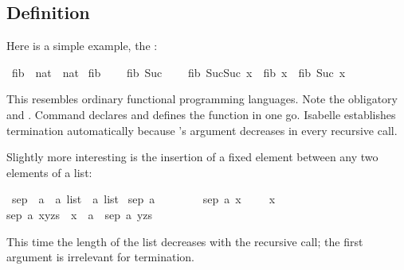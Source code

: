 %
\begin{isabellebody}%
\def\isabellecontext{fun{\isadigit{0}}}%
%
\isadelimtheory
%
\endisadelimtheory
%
\isatagtheory
%
\endisatagtheory
{\isafoldtheory}%
%
\isadelimtheory
%
\endisadelimtheory
%
\begin{isamarkuptext}%
\subsection{Definition}
\label{sec:fun-examples}

Here is a simple example, the :%
\end{isamarkuptext}%
\isamarkuptrue%
\isamarkupfalse%
\ fib\ {\isacharcolon}{\isacharcolon}\ {\isachardoublequoteopen}nat\ {\isasymRightarrow}\ nat{\isachardoublequoteclose}\ \isanewline
{\isachardoublequoteopen}fib\ {}\ {\isacharequal}\ {}{\isachardoublequoteclose}\ {\isacharbar}\isanewline
{\isachardoublequoteopen}fib\ {\isacharparenleft}Suc\ {}{\isacharparenright}\ {\isacharequal}\ {}{\isachardoublequoteclose}\ {\isacharbar}\isanewline
{\isachardoublequoteopen}fib\ {\isacharparenleft}Suc{\isacharparenleft}Suc\ x{\isacharparenright}{\isacharparenright}\ {\isacharequal}\ fib\ x\ {\isacharplus}\ fib\ {\isacharparenleft}Suc\ x{\isacharparenright}{\isachardoublequoteclose}%
\begin{isamarkuptext}%
\noindent
This resembles ordinary functional programming languages. Note the obligatory
 and \isa{|}. Command  declares and
defines the function in one go. Isabelle establishes termination automatically
because 's argument decreases in every recursive call.

Slightly more interesting is the insertion of a fixed element
between any two elements of a list:%
\end{isamarkuptext}%
\isamarkuptrue%
\isamarkupfalse%
\ sep\ {\isacharcolon}{\isacharcolon}\ {\isachardoublequoteopen}{\isacharprime}a\ {\isasymRightarrow}\ {\isacharprime}a\ list\ {\isasymRightarrow}\ {\isacharprime}a\ list{\isachardoublequoteclose}\ \isanewline
{\isachardoublequoteopen}sep\ a\ {\isacharbrackleft}{\isacharbrackright}\ \ \ \ \ {\isacharequal}\ {\isacharbrackleft}{\isacharbrackright}{\isachardoublequoteclose}\ {\isacharbar}\isanewline
{\isachardoublequoteopen}sep\ a\ {\isacharbrackleft}x{\isacharbrackright}\ \ \ \ {\isacharequal}\ {\isacharbrackleft}x{\isacharbrackright}{\isachardoublequoteclose}\ {\isacharbar}\isanewline
{\isachardoublequoteopen}sep\ a\ {\isacharparenleft}x{\isacharhash}y{\isacharhash}zs{\isacharparenright}\ {\isacharequal}\ x\ {\isacharhash}\ a\ {\isacharhash}\ sep\ a\ {\isacharparenleft}y{\isacharhash}zs{\isacharparenright}{\isachardoublequoteclose}%
\begin{isamarkuptext}%
\noindent
This time the length of the list decreases with the
recursive call; the first argument is irrelevant for termination.


\end{isamarkuptext}
\end{isabellebody}
